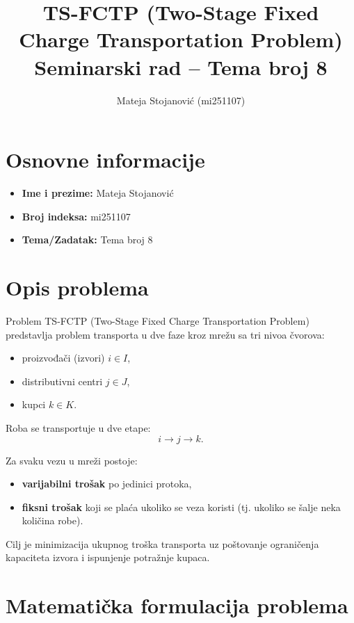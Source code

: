 \documentclass[12pt,a4paper]{article}
\title{\textbf{TS-FCTP (Two-Stage Fixed Charge Transportation Problem)}\\
Seminarski rad -- Tema broj 8}
\author{
Mateja Stojanović (mi251107)
}
\date{}
\begin{document}
\maketitle

\section*{Osnovne informacije}
\begin{itemize}
    \item \textbf{Ime i prezime:} Mateja Stojanović
    \item \textbf{Broj indeksa:} mi251107
    \item \textbf{Tema/Zadatak:} Tema broj 8
\end{itemize}

\section{Opis problema}
Problem TS-FCTP (Two-Stage Fixed Charge Transportation Problem) predstavlja problem transporta u dve faze kroz mrežu sa tri nivoa čvorova:
\begin{itemize}
    \item proizvođači (izvori) $i \in I$,
    \item distributivni centri $j \in J$,
    \item kupci $k \in K$.
\end{itemize}

Roba se transportuje u dve etape:
\[
i \rightarrow j \rightarrow k.
\]

Za svaku vezu u mreži postoje:
\begin{itemize}
    \item \textbf{varijabilni trošak} po jedinici protoka,
    \item \textbf{fiksni trošak} koji se plaća ukoliko se veza koristi (tj. ukoliko se šalje neka količina robe).
\end{itemize}

Cilj je minimizacija ukupnog troška transporta uz poštovanje ograničenja kapaciteta izvora i ispunjenje potražnje kupaca.

\section{Matematička formulacija problema}
\end{document}
